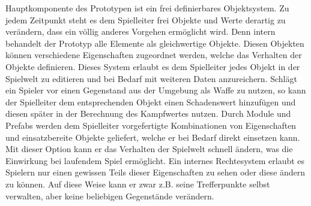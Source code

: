Hauptkomponente des Prototypen ist ein frei definierbares Objektsystem. Zu jedem Zeitpunkt steht es dem Spielleiter frei Objekte und Werte derartig zu verändern, dass ein völlig anderes Vorgehen ermöglicht wird. Denn intern behandelt der Prototyp alle Elemente als gleichwertige Objekte. Diesen Objekten können verschiedene Eigenschaften zugeordnet werden, welche das Verhalten der Objekte definieren. Dieses System erlaubt es dem Spielleiter jedes Objekt in der Spielwelt zu editieren und bei Bedarf mit weiteren Daten anzureichern. Schlägt ein Spieler vor einen Gegenstand aus der Umgebung als Waffe zu nutzen, so kann der Spielleiter dem entsprechenden Objekt einen Schadenswert hinzufügen und diesen später in der Berechnung des Kampfwertes nutzen.\newline
Durch Module und Prefabs werden dem Spielleiter vorgefertigte Kombinationen von Eigenschaften und einsatzbereite Objekte geliefert, welche er bei Bedarf direkt einsetzen kann. Mit dieser Option kann er das Verhalten der Spielwelt schnell ändern, was die Einwirkung bei laufendem Spiel ermöglicht.\newline
Ein internes Rechtesystem erlaubt es Spielern nur einen gewissen Teils dieser Eigenschaften zu sehen oder diese ändern zu können. Auf diese Weise kann er zwar z.B. seine Trefferpunkte selbst verwalten, aber keine beliebigen Gegenstände verändern.

